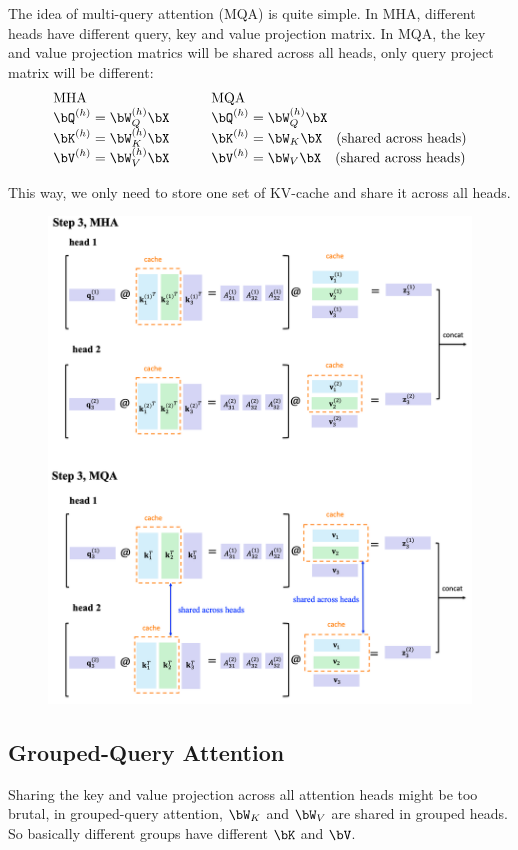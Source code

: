 \documentclass{article}
\begin{document}
The idea of multi-query attention (MQA) is quite simple. 
In MHA, different heads have different query, key and value projection matrix.
In MQA, the key and value projection matrics will be shared across all heads, only query project matrix will be different:
\[
\begin{array}{ll}
   \text{MHA} & \qquad \text{MQA} \\
  \bQ^{(h)} = \bW_Q^{(h)} \bX & \qquad  \bQ^{(h)} = \bW_Q^{(h)} \bX \\
  \bK^{(h)} = \bW_K^{(h)} \bX & \qquad  \bK^{(h)} = \bW_K \bX \quad \text{(shared across heads)} \\
  \bV^{(h)} = \bW_V^{(h)} \bX & \qquad  \bV^{(h)} = \bW_V \bX \quad \text{(shared across heads)}
\end{array}
\]

This way, we only need to store one set of KV-cache and share it across all heads.
\begin{figure}[!h]
	\centering
	\includegraphics[scale=0.43]{imgs/MQA.png}
\end{figure}

\subsection{Grouped-Query Attention}
Sharing the key and value projection across all attention heads might be too brutal, in grouped-query attention, $\bW_K$ and $\bW_V$ are shared in grouped heads.
So basically different groups have different $\bK$ and $\bV$.
\end{document}
